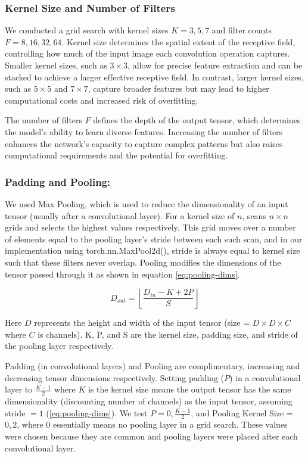 \subsubsection{Kernel Size and Number of Filters}

We conducted a grid search with kernel sizes $K = {3, 5, 7}$ and filter counts $F = {8, 16, 32, 64}$. Kernel size determines the spatial extent of the receptive field, controlling how much of the input image each convolution operation captures. Smaller kernel sizes, such as $3\times3$, allow for precise feature extraction and can be stacked to achieve a larger effective receptive field. In contrast, larger kernel sizes, such as $5\times5$ and $7\times7$, capture broader features but may lead to higher computational costs and increased risk of overfitting.

The number of filters $F$ defines the depth of the output tensor, which determines the model's ability to learn diverse features. Increasing the number of filters enhances the network's capacity to capture complex patterns but also raises computational requirements and the potential for overfitting.
\subsubsection{Padding and Pooling:}

We used Max Pooling, which is used to reduce the dimensionality of an input tensor (usually after a convolutional layer). For a kernel size of $n$, scans $n\times n$ grids and selects the highest values respectively. This grid moves over a number of elements equal to the pooling layer's stride between each such scan, and in our implementation using torch.nn.MaxPool2d(), stride is always equal to kernel size such that these filters never overlap. Pooling modifies the dimensions of the tensor passed through it as shown in equation \ref{eq:pooling-dims}.

\begin{equation}
    D_{out} = \left\lfloor\frac {D_{in} -K + 2P}{S}\right\rfloor
    \label{eq:pooling-dims}
\end{equation}


Here $D$ represents the height and width of the input tensor (size = $D\times D \times C$ where $C$ is channels). K, P, and S are the kernel size, padding size, and stride of the pooling layer respectively.

Padding (in convolutional layers) and Pooling are complimentary, increasing and decreasing tensor dimensions respectively. Setting padding ($P$) in a convolutional layer to $\frac {K-1}2$ where $K$ is the kernel size means the output tensor has the same dimensionality (discounting number of channels) as the input tensor, assuming stride $= 1$ (\ref{eq:pooling-dims}). We test $P = 0,\frac {K-1}2$, and Pooling Kernel Size = $0,2$, where $0$ essentially means no pooling layer in a grid search. These values were chosen because they are common and pooling layers were placed after each convolutional layer.


